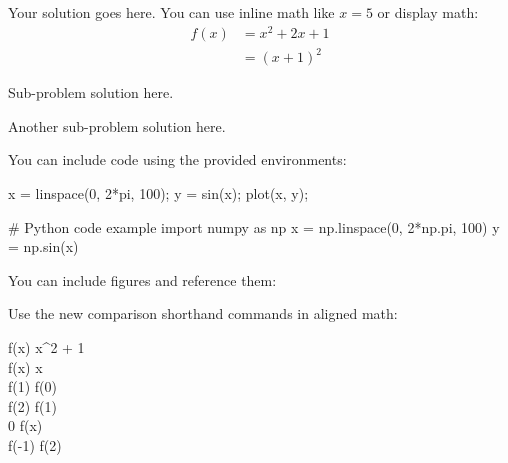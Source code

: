 \documentclass{homework}
\begin{document}


Your solution goes here. You can use inline math like $x = 5$ or display math:
\begin{align}
    f(x) &= x^2 + 2x + 1 \\
    &= (x + 1)^2
\end{align}

\subproblem
Sub-problem solution here.

\subproblem
Another sub-problem solution here.


You can include code using the provided environments:

\begin{hwmatlab}
x = linspace(0, 2*pi, 100);
y = sin(x);
plot(x, y);
\end{hwmatlab}

\begin{hwpython}
# Python code example
import numpy as np
x = np.linspace(0, 2*np.pi, 100)
y = np.sin(x)
\end{hwpython}



You can include figures and reference them:

% 


Use the new comparison shorthand commands in aligned math:

\begin{hwmath}
f(x) \eq x^2 + 1 \\
f(x)   x \\
f(1) \gt f(0) \\
f(2) \ggt f(1) \\
0 \lt f(x) \\
f(-1) \llt f(2)
\end{hwmath}
\end{document}
